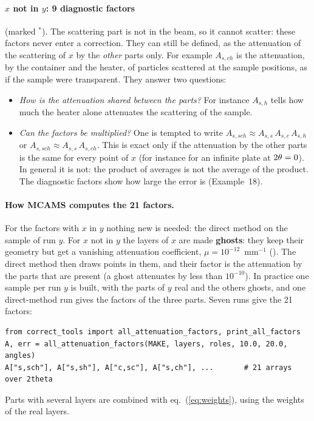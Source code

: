 \paragraph{$x$ not in $y$: 9 diagnostic factors} (marked $^{*}$). The scattering part is not in the beam, so it cannot scatter: these
factors never enter a correction. They can still be defined, as the attenuation of the scattering of $x$ by the \emph{other} parts only.
For example $A_{s,ch}$ is the attenuation, by the container and the heater, of particles scattered at the sample positions, as if the
sample were transparent. They answer two questions:
\begin{itemize}
  \item \emph{How is the attenuation shared between the parts?} For instance $A_{s,h}$ tells how much the heater alone attenuates the
        scattering of the sample.
  \item \emph{Can the factors be multiplied?} One is tempted to write $A_{s,sch}\approx A_{s,s}\,A_{s,c}\,A_{s,h}$ or
        $A_{s,sch}\approx A_{s,s}\,A_{s,ch}$. This is exact only if the attenuation by the other parts is the same for every point of
        $x$ (for instance for an infinite plate at $2\theta=0$). In general it is not: the product of averages is not the average of
        the product. The diagnostic factors show how large the error is (Example~18).
\end{itemize}

\paragraph{How MCAMS computes the 21 factors.} For the factors with $x$ in $y$ nothing new is needed: the direct method on the sample of
run $y$. For $x$ not in $y$ the layers of $x$ are made \textbf{ghosts}: they keep their geometry but get a vanishing attenuation coefficient,
$\mu = 10^{-12}$~mm$^{-1}$ (). The direct method then draws points in them, and their factor is the attenuation by the
parts that are present (a ghost attenuates by less than $10^{-10}$). In practice one sample per run $y$ is built, with the parts of $y$ real
and the others ghosts, and one direct-method run gives the factors of the three parts. Seven runs give the 21 factors:
\begin{lstlisting}
from correct_tools import all_attenuation_factors, print_all_factors
A, err = all_attenuation_factors(MAKE, layers, roles, 10.0, 20.0, angles)
A["s,sch"], A["s,sh"], A["c,sc"], A["s,ch"], ...       # 21 arrays over 2theta
\end{lstlisting}
Parts with several layers are combined with eq.~(\ref{eq:weights}), using the weights of the real layers.

